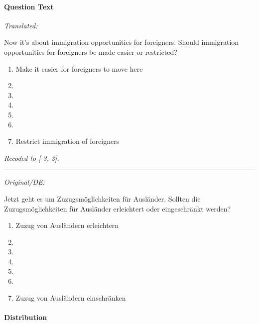 \documentclass[
]{article}
\providecommand{\tightlist}{%
  \setlength{\itemsep}{0pt}\setlength{\parskip}{0pt}}
\begin{document}
\hypertarget{question-text}{%
\paragraph{Question Text}\label{question-text}}

\emph{Translated:}

Now it's about immigration opportunities for foreigners. Should immigration opportunities for foreigners be made easier or restricted?

\begin{enumerate}
\def\labelenumi{(\arabic{enumi})}
\tightlist
\item
  Make it easier for foreigners to move here
\item
\item
\item
\item
\item
\item
  Restrict immigration of foreigners
\end{enumerate}

\emph{Recoded to {[}-3, 3{]}.}

\begin{center}\rule{0.5\linewidth}{0.5pt}\end{center}

\emph{Original/DE:}

Jetzt geht es um Zuzugsmöglichkeiten für Ausländer. Sollten die Zuzugsmöglichkeiten für Ausländer erleichtert oder eingeschränkt werden?

\begin{enumerate}
\def\labelenumi{(\arabic{enumi})}
\tightlist
\item
  Zuzug von Ausländern erleichtern
\item
\item
\item
\item
\item
\item
  Zuzug von Ausländern einschränken
\end{enumerate}

\hypertarget{distribution}{%
\paragraph{Distribution}\label{distribution}}
\end{document}
